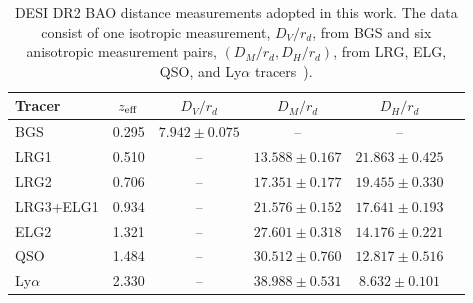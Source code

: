\begin{table}[t]
\centering
\caption{
DESI DR2 BAO distance measurements adopted in this work.
The data consist of one isotropic measurement, $D_V/r_d$,
from BGS and six anisotropic measurement pairs,
$(D_M/r_d,D_H/r_d)$, from LRG, ELG, QSO, and
Ly$\alpha$ tracers~\cite{DESIDR2Cosmology}).
}
\label{tab:desi_dr2_bao}
\begin{ruledtabular}
\begin{tabular}{lccccc}
Tracer &
$z_{\rm eff}$ &
$D_V/r_d$ &
$D_M/r_d$ &
$D_H/r_d$ \\
\hline
BGS &
0.295 & $7.942\pm0.075$ & -- & --  \\
LRG1 &
0.510 & -- & $13.588\pm0.167$ &
$21.863\pm0.425$ \\
LRG2 &
0.706 & -- & $17.351\pm0.177$ &
$19.455\pm0.330$ \\
LRG3+ELG1 &
0.934 & -- & $21.576\pm0.152$ &
$17.641\pm0.193$ \\
ELG2 &
1.321 & -- & $27.601\pm0.318$ &
$14.176\pm0.221$  \\
QSO &
1.484 & -- & $30.512\pm0.760$ &
$12.817\pm0.516$  \\
Ly$\alpha$ &
2.330 & -- & $38.988\pm0.531$ &
$8.632\pm0.101$  \\
\end{tabular}
\end{ruledtabular}
\end{table}
